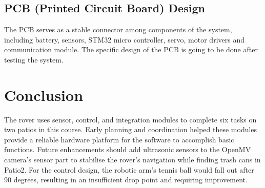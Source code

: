 \documentclass{article}
\begin{document}
    \subsection{PCB (Printed Circuit Board) Design}
    The PCB serves as a stable connector among components of the system, including battery, sensors, STM32 micro controller, servo, motor drivers and communication module. The specific design of the PCB is going to be done after testing the system.
    
\section{Conclusion}
The rover uses sensor, control, and integration modules to complete six tasks on two patios in this course. Early planning and coordination helped these modules provide a reliable hardware platform for the software to accomplish basic functions. Future enhancements should add ultrasonic sensors to the OpenMV camera's sensor part to stabilise the rover's navigation while finding trash cans in Patio2. For the control design, the robotic arm's tennis ball would fall out after 90 degrees, resulting in an insufficient drop point and requiring improvement.



 
\end{document}
